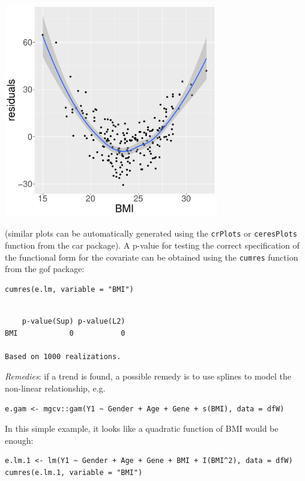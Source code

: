 \documentclass[12pt]{article}
\begin{document}
\begin{center}
\includegraphics[width=0.7\textwidth]{./figures/A1-BMI.pdf}
\end{center} 

(similar plots can be automatically generated using the \texttt{crPlots} or
\texttt{ceresPlots} function from the car package). A p-value for testing the correct
specification of the functional form for the covariate can be obtained
using the \texttt{cumres} function from the gof package:
\lstset{language=r,label= ,caption= ,captionpos=b,numbers=none}
\begin{lstlisting}
cumres(e.lm, variable = "BMI")
\end{lstlisting}

\begin{verbatim}

    p-value(Sup) p-value(L2)
BMI            0           0

Based on 1000 realizations.
\end{verbatim}

\emph{Remedies}: if a trend is found, a possible remedy is to use splines to model the
non-linear relationship, e.g. 
\lstset{language=r,label= ,caption= ,captionpos=b,numbers=none}
\begin{lstlisting}
e.gam <- mgcv::gam(Y1 ~ Gender + Age + Gene + s(BMI), data = dfW)
\end{lstlisting}

In this simple example, it looks like a quadratic function of BMI
would be enough:
\lstset{language=r,label= ,caption= ,captionpos=b,numbers=none}
\begin{lstlisting}
e.lm.1 <- lm(Y1 ~ Gender + Age + Gene + BMI + I(BMI^2), data = dfW)
cumres(e.lm.1, variable = "BMI")
\end{lstlisting}
\end{document}
